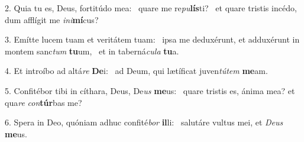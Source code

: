 2. Quia tu es, Deus, fortitúdo mea: \dag\  quare me re\textit{pu}\textbf{lís}ti? \ast\  et quare tristis incédo, dum afflígit me \textit{in}\textit{i}\textbf{mí}cus?\

3. Emítte lucem tuam et veritátem tuam: \dag\  ipsa me deduxérunt, et adduxérunt in montem sanc\textit{tum} \textbf{tu}um, \ast\  et in taberná\textit{cu}\textit{la} \textbf{tu}a.\

4. Et introíbo ad altá\textit{re} \textbf{De}i: \ast\  ad Deum, qui lætíficat juven\textit{tú}\textit{tem} \textbf{me}am.\

5. Confitébor tibi in cíthara, Deus, De\textit{us} \textbf{me}us: \ast\  quare tristis es, ánima mea? et qua\textit{re} \textit{con}\textbf{túr}bas me?\

6. Spera in Deo, quóniam adhuc confité\textit{bor} \textbf{il}li: \ast\  salutáre vultus mei, et \textit{De}\textit{us} \textbf{me}us.\

